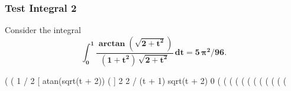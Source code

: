 \documentclass[12pt]{article}
\begin{document}
\subsubsection*{Test Integral 2}
Consider the integral
\begin{equation}
\mathbf{\int_{0}^{1} \frac{\boldsymbol{\arctan}(\sqrt{2 + t^{2}})}{(1 + t^{2})\,\sqrt{2+t^{2}}}\,dt = 5\,\boldsymbol{\pi}^{2}/96}.
\end{equation} 
\begin{myVerbatim}
(%
(%
                           1
                          /              2
                          [   atan(sqrt(t  + 2))
(%
                          ]    2            2
                          /  (t  + 1) sqrt(t  + 2)
                           0
(%
(%
(%
(%
(%
(%
(%
(%
(%
(%
(%
(%
\end{myVerbatim} 
\end{document}
